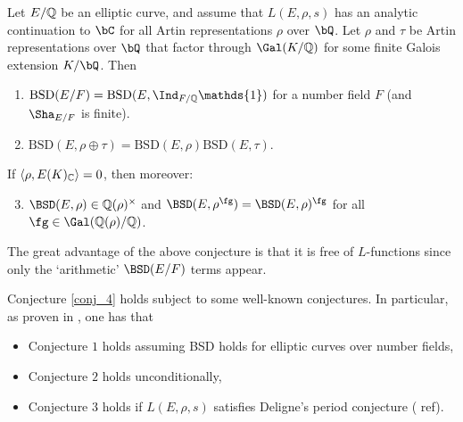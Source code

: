 \begin{conj}{\cite[Conjecture 4]{DEW1}}\label{conj_4}
    Let $E/\mathbb{Q}$ be an elliptic curve, and assume that $L(E, \rho, s)$ has an analytic continuation to $\bC$ for all Artin representations $\rho$ over $\bQ$. Let $\rho$ and $\tau$ be Artin representations over $\bQ$ that factor through $\Gal(K/\QQ)$ for some finite Galois extension $K / \bQ$. Then 
    \begin{enumerate}[label={\bfseries C\arabic*.}]
        \item $\mathrm{BSD}(E/F)=\mathrm{BSD}(E,\Ind_{F/\QQ}\mathds{1})$ for a number field $F$ (and $\Sha_{E/F}$ is finite).
        \item $\mathrm{BSD}(E,\rho\oplus\tau)=\mathrm{BSD}(E,\rho)\mathrm{BSD}(E,\tau)$.
    \end{enumerate}       
        If $\langle\rho,E(K)_{\mathbb{C}}\rangle=0$, then moreover:
    \begin{enumerate}[label={\bfseries C\arabic*.}]
        \setcounter{enumi}{2}
       \item $\BSD(E,\rho)\in\QQ(\rho)^{\times}$ and $\BSD(E,\rho^{\fg})=\BSD(E,\rho)^{\fg}$ for all $\fg\in\Gal(\QQ(\rho)/\QQ)$.
    \end{enumerate}
\end{conj}

The great advantage of the above conjecture is that it is free of $L$-functions since only the `arithmetic' $\BSD(E/F)$ terms appear.

\begin{rem}
   Conjecture \ref{conj_4} holds subject to some well-known conjectures. In particular, as proven in \cite[Corollary 25]{DEW1}, one has that
   \begin{itemize}[-]
    \setlength\itemsep{0em}
    \item Conjecture $1$ holds assuming BSD holds for elliptic curves over number fields,
    \item Conjecture $2$ holds unconditionally,
    \item Conjecture $3$ holds if $L(E, \rho, s)$ satisfies Deligne's period conjecture ({\color{red} ref}).
   \end{itemize}
   
\end{rem}




